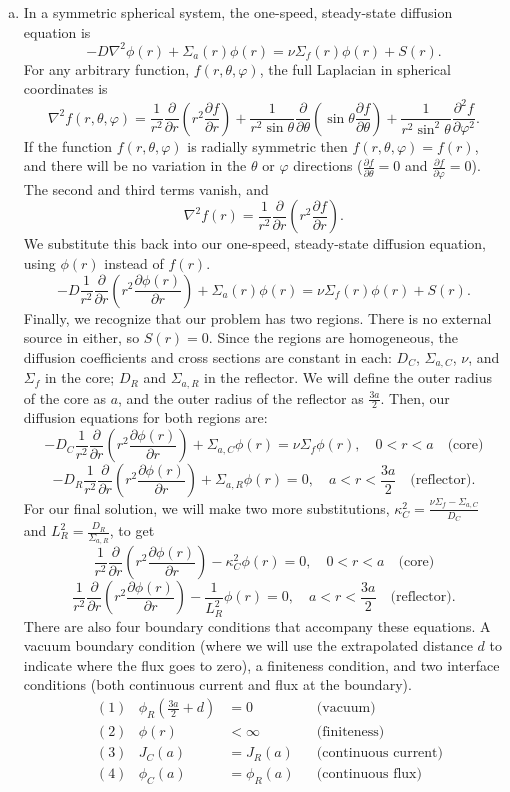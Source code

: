 \documentclass{report}
\newcommand{\lap}{\nabla^2}
\newcommand{\p}{\partial}
\begin{document}
\begin{enumerate}[a)]

\item

 In a symmetric spherical system, the one-speed, steady-state diffusion equation is
$$ -D \lap \phi(r) + \Sigma_a (r) \phi(r) = \nu \Sigma_f(r) \phi(r) + S(r) .$$
For any arbitrary function, $f(r,\theta,\varphi)$, the full Laplacian in spherical coordinates is
$$ \lap f(r,\theta,\varphi) = \frac{1}{r^2}\frac{\p}{\p r}\left(r^2 \frac{\p f}{\p r}\right) +  \frac{1}{r^2 \sin\theta} \frac{\p}{\p \theta}\left(\sin\theta \frac{\p f}{\p \theta}\right) + \frac{1}{r^2 \sin^2 \theta} \frac{\p^2 f}{\p \varphi^2} .$$
If the function $f(r,\theta,\varphi)$ is radially symmetric then $f(r,\theta,\varphi) = f(r)$, and there will be no variation in the $\theta$ or $\varphi$ directions ($\frac{\p f}{\p \theta} = 0$ and $\frac{\p f}{\p \varphi} = 0$).  The second and third terms vanish, and
$$ \lap f(r) = \frac{1}{r^2}\frac{\p}{\p r}\left(r^2 \frac{\p f}{\p r}\right) .$$
We substitute this back into our one-speed, steady-state diffusion equation, using $\phi(r)$ instead of $f(r)$.
$$ -D \frac{1}{r^2}\frac{\p}{\p r}\left(r^2 \frac{\p \phi(r)}{\p r}\right) + \Sigma_a (r) \phi(r) = \nu \Sigma_f(r) \phi(r) + S(r) .$$
Finally, we recognize that our problem has two regions. There is no external source in either, so $S(r) = 0$. Since the regions are homogeneous, the diffusion coefficients and cross sections are constant in each: $D_C$, $\Sigma_{a,C}$, $\nu$, and $\Sigma_f$ in the core; $D_R$ and $\Sigma_{a,R}$ in the reflector. We will define the outer radius of the core as $a$, and the outer radius of the reflector as $\frac{3a}{2}$. Then, our diffusion equations for both regions are:
$$ -D_C \frac{1}{r^2}\frac{\p}{\p r}\left(r^2 \frac{\p \phi(r)}{\p r}\right) + \Sigma_{a,C} \phi(r) = \nu \Sigma_f \phi(r), \quad 0 < r < a \quad\text{(core)} $$
$$ -D_R \frac{1}{r^2}\frac{\p}{\p r}\left(r^2 \frac{\p \phi(r)}{\p r}\right) + \Sigma_{a,R}\phi(r) = 0, \quad a < r < \frac{3a}{2} \quad\text{(reflector)}.$$
For our final solution, we will make two more substitutions, $\kappa_C^2 = \frac{\nu\Sigma_f - \Sigma_{a,C}}{D_C}$ and $L_R^2 = \frac{D_R}{\Sigma_{a,R}}$, to get
$$ \frac{1}{r^2}\frac{\p}{\p r}\left(r^2 \frac{\p \phi(r)}{\p r}\right) - \kappa_C^2 \phi(r) = 0, \quad 0 < r < a \quad\text{(core)} $$
$$ \frac{1}{r^2}\frac{\p}{\p r}\left(r^2 \frac{\p \phi(r)}{\p r}\right) - \frac{1}{L_R^2}\phi(r) = 0, \quad a < r < \frac{3a}{2} \quad\text{(reflector)} .$$
There are also four boundary conditions that accompany these equations. A vacuum boundary condition (where we will use the extrapolated distance $d$ to indicate where the flux goes to zero), a finiteness condition, and two interface conditions (both continuous current and flux at the boundary). 
\begin{align*}
&(1)& \phi_R\left(\frac{3a}{2}+d\right) &= 0 	& &\text{(vacuum)} \\
&(2)& \phi(r) &< \infty  					& &\text{(finiteness)} \\
&(3)& J_C(a) &= J_R(a)						& &\text{(continuous current)} \\
&(4)& \phi_C(a) &= \phi_R(a)				& &\text{(continuous flux)}
\end{align*}


\end{enumerate}
\end{document}
